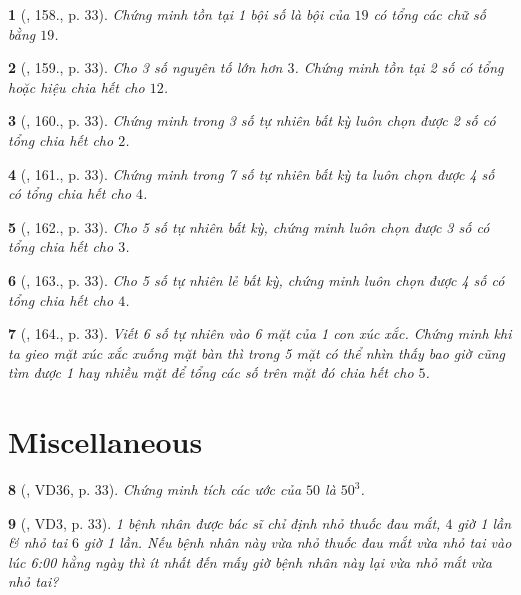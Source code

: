 \documentclass{article}
\newtheorem{baitoan}{}
\begin{document}
\begin{baitoan}[\cite{Tuyen_Toan_6}, 158., p. 33]
	Chứng minh tồn tại 1 bội số là bội của $19$ có tổng các chữ số bằng $19$.
\end{baitoan}

\begin{baitoan}[\cite{Tuyen_Toan_6}, 159., p. 33]
	Cho 3 số nguyên tố lớn hơn $3$. Chứng minh tồn tại 2 số có tổng hoặc hiệu chia hết cho $12$.
\end{baitoan}

\begin{baitoan}[\cite{Tuyen_Toan_6}, 160., p. 33]
	Chứng minh trong 3 số tự nhiên bất kỳ luôn chọn được 2 số có tổng chia hết cho $2$.
\end{baitoan}

\begin{baitoan}[\cite{Tuyen_Toan_6}, 161., p. 33]
	Chứng minh trong 7 số tự nhiên bất kỳ ta luôn chọn được 4 số có tổng chia hết cho $4$.
\end{baitoan}

\begin{baitoan}[\cite{Tuyen_Toan_6}, 162., p. 33]
	Cho 5 số tự nhiên bất kỳ, chứng minh luôn chọn được 3 số có tổng chia hết cho $3$.
\end{baitoan}

\begin{baitoan}[\cite{Tuyen_Toan_6}, 163., p. 33]
	Cho 5 số tự nhiên lẻ bất kỳ, chứng minh luôn chọn được 4 số có tổng chia hết cho $4$.
\end{baitoan}

\begin{baitoan}[\cite{Tuyen_Toan_6}, 164., p. 33]
	Viết 6 số tự nhiên vào 6 mặt của 1 con xúc xắc. Chứng minh khi ta gieo mặt xúc xắc xuống mặt bàn thì trong 5 mặt có thể nhìn thấy bao giờ cũng tìm được 1 hay nhiều mặt để tổng các số trên mặt đó chia hết cho $5$.
\end{baitoan}


\section{Miscellaneous}

\begin{baitoan}[\cite{Tuyen_Toan_6}, VD36, p. 33]
	Chứng minh tích các ước của $50$ là $50^3$.
\end{baitoan}

\begin{baitoan}[\cite{Tuyen_Toan_6}, VD3, p. 33]
	1 bệnh nhân được bác sĩ chỉ định nhỏ thuốc đau mắt, $4$ giờ 1 lần \& nhỏ tai $6$ giờ 1 lần. Nếu bệnh nhân này vừa nhỏ thuốc đau mắt vừa nhỏ tai vào lúc {\rm6:00} hằng ngày thì ít nhất đến mấy giờ bệnh nhân này lại vừa nhỏ mắt vừa nhỏ tai?
\end{baitoan}
\end{document}
